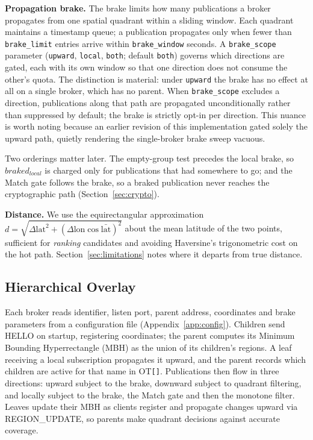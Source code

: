 \documentclass[10pt]{article}
\begin{document}
\textbf{Propagation brake.} The brake limits how many publications a broker propagates from one spatial quadrant within a sliding window. Each quadrant maintains a timestamp queue; a publication propagates only when fewer than \texttt{brake\_limit} entries arrive within \texttt{brake\_window} seconds. A \texttt{brake\_scope} parameter (\texttt{upward}, \texttt{local}, \texttt{both}; default \texttt{both}) governs which directions are gated, each with its own window so that one direction does not consume the other's quota. The distinction is material: under \texttt{upward} the brake has no effect at all on a single broker, which has no parent. When \texttt{brake\_scope} excludes a direction, publications along that path are propagated unconditionally rather than suppressed by default; the brake is strictly opt-in per direction. This nuance is worth noting because an earlier revision of this implementation gated solely the upward path, quietly rendering the single-broker brake sweep vacuous.

Two orderings matter later. The empty-group test precedes the local brake, so $braked_{local}$ is charged only for publications that had somewhere to go; and the Match gate follows the brake, so a braked publication never reaches the cryptographic path (Section~\ref{sec:crypto}).

\textbf{Distance.} We use the equirectangular approximation $d = \sqrt{\Delta\text{lat}^2 + (\Delta\text{lon}\cos\bar{\text{lat}})^2}$ about the mean latitude of the two points, sufficient for \emph{ranking} candidates and avoiding Haversine's trigonometric cost on the hot path. Section~\ref{sec:limitations} notes where it departs from true distance.

\subsection{Hierarchical Overlay}
\label{sec:overlay}

Each broker reads identifier, listen port, parent address, coordinates and brake parameters from a configuration file (Appendix~\ref{app:config}). Children send HELLO on startup, registering coordinates; the parent computes its Minimum Bounding Hyperrectangle (MBH) as the union of its children's regions. A leaf receiving a local subscription propagates it upward, and the parent records which children are active for that name in OT\texttt{[]}. Publications then flow in three directions: upward subject to the brake, downward subject to quadrant filtering, and locally subject to the brake, the Match gate and then the monotone filter. Leaves update their MBH as clients register and propagate changes upward via REGION\_UPDATE, so parents make quadrant decisions against accurate coverage.
\end{document}

